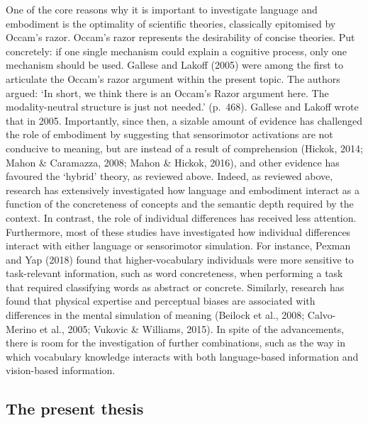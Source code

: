 \documentclass[
  12pt,
  man,floatsintext]{apa7}
\begin{document}
One of the core reasons why it is important to investigate language and embodiment is the optimality of scientific theories, classically epitomised by Occam's razor. Occam's razor represents the desirability of concise theories. Put concretely: if one single mechanism could explain a cognitive process, only one mechanism should be used. Gallese and Lakoff (2005) were among the first to articulate the Occam's razor argument within the present topic. The authors argued: `In short, we think there is an Occam's Razor argument here. The modality-neutral structure is just not needed.' (p.~468). Gallese and Lakoff wrote that in 2005. Importantly, since then, a sizable amount of evidence has challenged the role of embodiment by suggesting that sensorimotor activations are not conducive to meaning, but are instead of a result of comprehension (Hickok, 2014; Mahon \& Caramazza, 2008; Mahon \& Hickok, 2016), and other evidence has favoured the `hybrid' theory, as reviewed above. Indeed, as reviewed above, research has extensively investigated how language and embodiment interact as a function of the concreteness of concepts and the semantic depth required by the context. In contrast, the role of individual differences has received less attention. Furthermore, most of these studies have investigated how individual differences interact with either language or sensorimotor simulation. For instance, Pexman and Yap (2018) found that higher-vocabulary individuals were more sensitive to task-relevant information, such as word concreteness, when performing a task that required classifying words as abstract or concrete. Similarly, research has found that physical expertise and perceptual biases are associated with differences in the mental simulation of meaning (Beilock et al., 2008; Calvo-Merino et al., 2005; Vukovic \& Williams, 2015). In spite of the advancements, there is room for the investigation of further combinations, such as the way in which vocabulary knowledge interacts with both language-based information and vision-based information.

\hypertarget{the-present-thesis}{%
\subsection{The present thesis}\label{the-present-thesis}}
\end{document}

